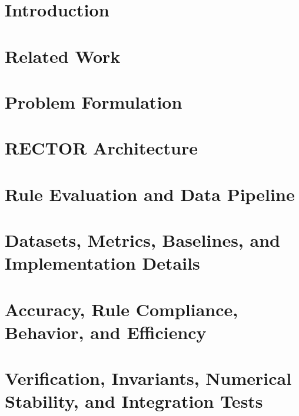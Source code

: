 \documentclass[lettersize,journal, twocolumn]{IEEEtran}
\begin{document}
\section{Introduction}
\label{Sec:Introduction}


\section{Related Work}
\label{Sec:Related_Works}


\section{Problem Formulation}
\label{Sec:Problem_Formulation}



\section{RECTOR Architecture}
\label{Sec:RECTOR}



\section{Rule Evaluation and Data Pipeline}
\label{Sec:Rule_Evaluation_And_Data_Pipeline}


\section{Datasets, Metrics, Baselines, and Implementation Details}
\label{Sec:Experiments}



\section{Accuracy, Rule Compliance, Behavior, and Efficiency}
\label{Sec:Accuracy_SectionRule-Compliance_Behavior_and_Efficiency}


\section{Verification, Invariants, Numerical Stability, and Integration Tests}
\label{Sec:Section_VIII_Verification_Invariants_Numerical_Stability_and_Integration_Tests}

\end{document}
